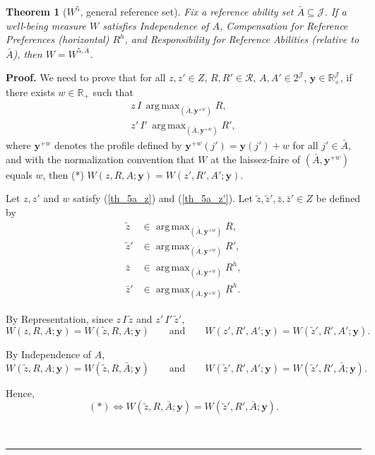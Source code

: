 \documentclass[12pt,thmsb]{article}
\DeclareMathOperator*{\argmax}{arg\,max}
\newtheorem{theorem}{Theorem}
\newenvironment{proof}[1][Proof]{\noindent \textbf{#1.} }{\  \rule{0.5em}{0.5em}}
\begin{document}
\begin{theorem}[$W^5$, general reference set]
Fix a reference ability set $\bar A\subseteq\mathcal J$. If a well-being measure $W$ satisfies Independence of $A$, Compensation for Reference Preferences (horizontal) $R^h$, and Responsibility for Reference Abilities (relative to $\bar A$), then $W=W^{5,\bar A}$.
\end{theorem}

\begin{proof}
We need to prove that for all $z,z'\in Z$, $R,R'\in\mathcal{R}$, $A,A'\in 2^{\mathcal{J}}$, $\mathbf y\in\mathbb{R}_{+}^{\mathcal{J}}$, if there exists $w\in\mathbb{R}_{+}$ such that
\begin{align}
z\,I\,\argmax_{(\bar A,\mathbf{y}^{+w})}R, \label{th_5a_z}\\
z'\,I'\,\argmax_{(\bar A,\mathbf{y}^{+w})}R', \label{th_5a_z'}
\end{align}
where $\mathbf y^{+w}$ denotes the profile defined by $\mathbf y^{+w}(j')=\mathbf y(j')+w$ for all $j'\in\bar A$, and with the normalization convention that $W$ at the laissez-faire of $(\bar A,\mathbf y^{+w})$ equals $w$, then (*) $W(z,R,A;\mathbf y)=W(z',R',A';\mathbf y)$.

Let $z,z'$ and $w$ satisfy (\ref{th_5a_z}) and (\ref{th_5a_z'}). Let $\tilde z,\tilde z',\bar z,\bar z'\in Z$ be defined by
\begin{align*}
\tilde z &\in \argmax_{(\bar A,\mathbf y^{+w})}R,\\
\tilde z' &\in \argmax_{(\bar A,\mathbf y^{+w})}R',\\
\bar z &\in \argmax_{(\bar A,\mathbf y^{+w})}R^h,\\
\bar z' &\in \argmax_{(\bar A,\mathbf y^{+w})}R^h.
\end{align*}

By Representation, since $z\,I\,\tilde z$ and $z'\,I'\,\tilde z'$,
\begin{equation*}
W(z,R,A;\mathbf y)=W(\tilde z,R,A;\mathbf y)
\qquad\text{and}\qquad
W(z',R',A';\mathbf y)=W(\tilde z',R',A';\mathbf y).
\end{equation*}

By Independence of $A$,
\begin{equation*}
W(\tilde z,R,A;\mathbf y)=W(\tilde z,R,\bar A;\mathbf y)
\qquad\text{and}\qquad
W(\tilde z',R',A';\mathbf y)=W(\tilde z',R',\bar A;\mathbf y).
\end{equation*}

Hence,
\begin{equation*}
(*)\Leftrightarrow W(\tilde z,R,\bar A;\mathbf y)=W(\tilde z',R',\bar A;\mathbf y).
\end{equation*}


\end{proof}
\end{document}
